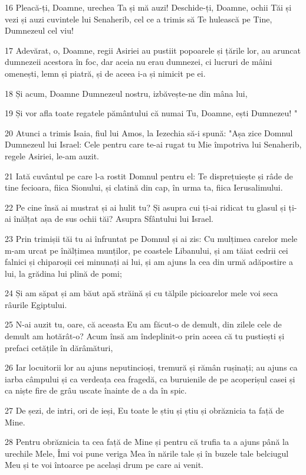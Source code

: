 \par 16 Pleacă-ți, Doamne, urechea Ta și mă auzi! Deschide-ți, Doamne, ochii Tăi și vezi și auzi cuvintele lui Senaherib, cel ce a trimis să Te hulească pe Tine, Dumnezeul cel viu!
\par 17 Adevărat, o, Doamne, regii Asiriei au pustiit popoarele și țările lor, au aruncat dumnezeii acestora în foc, dar aceia nu erau dumnezei, ci lucruri de mâini omenești, lemn și piatră, și de aceea i-a și nimicit pe ei.
\par 18 Și acum, Doamne Dumnezeul nostru, izbăvește-ne din mâna lui,
\par 19 Și vor afla toate regatele pământului că numai Tu, Doamne, ești Dumnezeu! "
\par 20 Atunci a trimis Isaia, fiul lui Amos, la Iezechia să-i spună: "Așa zice Domnul Dumnezeul lui Israel: Cele pentru care te-ai rugat tu Mie împotriva lui Senaherib, regele Asiriei, le-am auzit.
\par 21 Iată cuvântul pe care l-a rostit Domnul pentru el: Te disprețuiește și râde de tine fecioara, fiica Sionului, și clatină din cap, în urma ta, fiica Ierusalimului.
\par 22 Pe cine însă ai mustrat și ai hulit tu? Și asupra cui ți-ai ridicat tu glasul și ți-ai înălțat așa de sus ochii tăi? Asupra Sfântului lui Israel.
\par 23 Prin trimișii tăi tu ai înfruntat pe Domnul și ai zis: Cu mulțimea carelor mele m-am urcat pe înălțimea munților, pe coastele Libanului, și am tăiat cedrii cei falnici și chiparoșii cei minunați ai lui, și am ajuns la cea din urmă adăpostire a lui, la grădina lui plină de pomi;
\par 24 Și am săpat și am băut apă străină și cu tălpile picioarelor mele voi seca râurile Egiptului.
\par 25 N-ai auzit tu, oare, că aceasta Eu am făcut-o de demult, din zilele cele de demult am hotărât-o? Acum însă am îndeplinit-o prin aceea că tu pustiești și prefaci cetățile în dărâmături,
\par 26 Iar locuitorii lor au ajuns neputincioși, tremură și rămân rușinați; au ajuns ca iarba câmpului și ca verdeața cea fragedă, ca buruienile de pe acoperișul casei și ca niște fire de grâu uscate înainte de a da în spic.
\par 27 De șezi, de intri, ori de ieși, Eu toate le știu și știu și obrăznicia ta față de Mine.
\par 28 Pentru obrăznicia ta cea față de Mine și pentru că trufia ta a ajuns până la urechile Mele, Îmi voi pune veriga Mea în nările tale și în buzele tale belciugul Meu și te voi întoarce pe același drum pe care ai venit.
